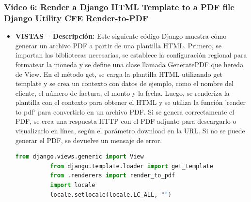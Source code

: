 \documentclass{article}
\begin{document}
  \subsubsection{Vídeo 6: Render a Django HTML Template to a PDF file Django Utility CFE Render-to-PDF}
    \begin{itemize}
      \item \textbf{VISTAS -- Descripción: }Este siguiente código Django muestra cómo generar un archivo PDF a partir de una plantilla HTML. 
      Primero, se importan las bibliotecas necesarias, se establece la configuración regional para formatear la moneda y se define una clase 
      llamada GeneratePDF que hereda de View.
      \newline
      En el método get, se carga la plantilla HTML utilizando get template y se crea un contexto con datos de ejemplo, como el nombre del 
      cliente, el número de factura, el monto y la fecha. Luego, se renderiza la plantilla con el contexto para obtener el HTML y se utiliza 
      la función 'render to pdf' para convertirlo en un archivo PDF.
      \newline
      Si se genera correctamente el PDF, se crea una respuesta HTTP con el PDF adjunto para descargarlo o visualizarlo en línea, 
      según el parámetro download en la URL. Si no se puede generar el PDF, se devuelve un mensaje de error.
        \begin{lstlisting}[language=Python]
          from django.views.generic import View
          from django.template.loader import get_template
          from .renderers import render_to_pdf
          import locale
          locale.setlocale(locale.LC_ALL, "")


\end{lstlisting}
\end{itemize}
\end{document}
